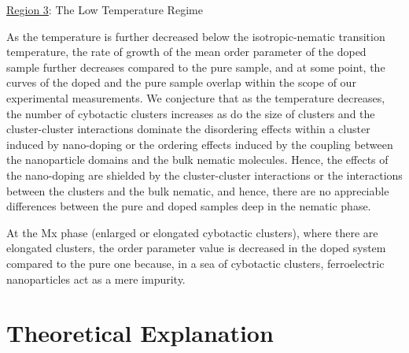 \documentclass[reprint,amsfonts,amsmath,amssymb,aps,pre,floatfix,10pt]{revtex4-1}
\begin{document}
\underline{Region 3}: The Low Temperature Regime

As the temperature is further decreased below the isotropic-nematic transition temperature, the rate of growth of the mean order parameter of the doped sample further decreases compared to the pure sample, and at some point, the curves of the doped and the pure sample overlap within the scope of our experimental measurements. We conjecture that as the temperature decreases, the number of cybotactic clusters increases as do the size of clusters and the cluster-cluster interactions dominate the disordering effects within a cluster induced by nano-doping or the ordering effects induced by the coupling between the nanoparticle domains and the bulk nematic molecules. Hence, the effects of the nano-doping are shielded by the cluster-cluster interactions or the interactions between the clusters and the bulk nematic, and hence, there are no appreciable differences between the pure and doped samples deep in the nematic phase. 

At the Mx phase (enlarged or elongated cybotactic clusters), where there are elongated clusters, the order parameter value is decreased in the doped system compared to the pure one because, in a sea of cybotactic clusters, ferroelectric nanoparticles act as a mere impurity.



\section{Theoretical Explanation}
\end{document}
